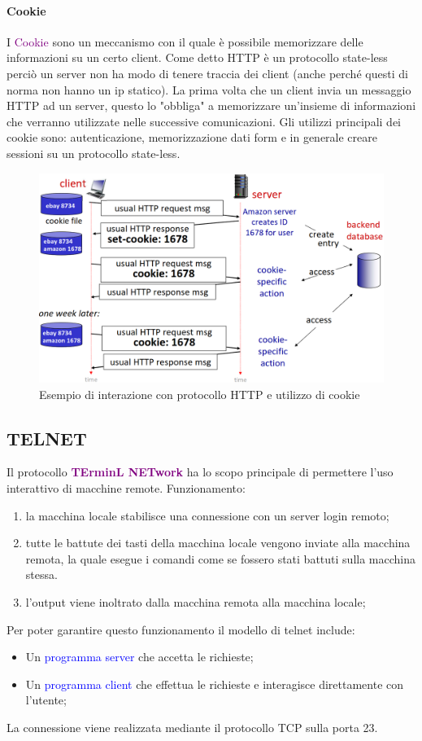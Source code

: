 \paragraph{Cookie} I \textcolor{purple}{Cookie} sono un meccanismo con il quale è possibile memorizzare delle informazioni su un certo client.
Come detto HTTP è un protocollo state-less perciò un server non ha modo di tenere traccia dei client (anche perché questi di norma non hanno un ip statico).
La prima volta che un client invia un messaggio HTTP ad un server, questo lo "obbliga" a memorizzare un'insieme di informazioni che verranno utilizzate nelle successive comunicazioni.
\newline Gli utilizzi principali dei cookie sono: autenticazione, memorizzazione dati form e in generale creare sessioni su un protocollo state-less.

\begin{figure}[h]
    \centering
    \includegraphics[scale=0.25]{Immagini/Cookie.png}
    \caption{Esempio di interazione con protocollo HTTP e utilizzo di cookie}
\end{figure}
\newpage
\subsection{TELNET} Il protocollo \textbf{\textcolor{purple}{TErminL NETwork}} ha lo scopo principale di permettere l'uso interattivo di macchine remote. Funzionamento:
\begin{enumerate}
    \item la macchina locale stabilisce una connessione con un server login remoto;
    \item tutte le battute dei tasti della macchina locale vengono inviate alla macchina remota, la quale esegue i comandi come se fossero stati battuti sulla macchina stessa.
    \item l'output viene inoltrato dalla macchina remota alla macchina locale;
\end{enumerate}
Per poter garantire questo funzionamento il modello di telnet include:
\begin{itemize}
    \item Un \textcolor{blue}{programma server} che accetta le richieste;
    \item Un \textcolor{blue}{programma client} che effettua le richieste e interagisce direttamente con l'utente;
\end{itemize}
La connessione viene realizzata mediante il protocollo TCP sulla porta 23.

